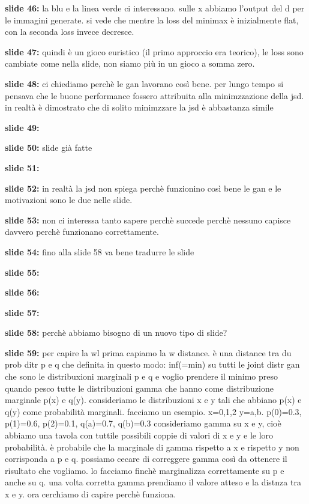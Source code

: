 \textbf{slide 46:} la blu e la linea verde ci interessano. sulle x abbiamo l'output del d per le immagini 
generate. si vede che mentre la loss del minimax è inizialmente flat, con la seconda loss invece decresce.

\textbf{slide 47:} quindi è un gioco euristico (il primo approccio era teorico), le loss sono cambiate come
nella slide, non siamo più in un gioco a somma zero.

\textbf{slide 48:} ci chiediamo perchè le gan lavorano così bene. per lungo tempo si pensava che le buone 
performance fossero attribuita alla minimzzazione della jsd. in realtà è dimostrato che di solito minimzzare 
la jsd è abbastanza simile 

\textbf{slide 49:} 

\textbf{slide 50:} slide già fatte

\textbf{slide 51:}

\textbf{slide 52:} in realtà la jsd non spiega perchè funzionino così bene le gan e le motivazioni sono le 
due nelle slide. 

\textbf{slide 53:} non ci interessa tanto sapere perchè succede perchè nessuno capisce davvero perchè 
funzionano correttamente. 

\textbf{slide 54:} fino alla slide 58 va bene tradurre le slide

\textbf{slide 55:} 

\textbf{slide 56:} 

\textbf{slide 57:}

\textbf{slide 58:} perchè abbiamo bisogno di un nuovo tipo di slide? 

\textbf{slide 59:} per capire la wl prima capiamo la w distance. è una distance tra du prob ditr p e q 
che definita in questo modo: inf(=min) su tutti le joint distr gan che sono le distribuxioni marginali p e 
q e voglio prendere il minimo preso quando pesco tutte le distribuzioni gamma che hanno come distribuzione 
marginale p(x) e q(y). consideriamo le distribuzioni x e y tali che abbiano p(x) e q(y) come probabilità 
marginali. facciamo un esempio. x={0,1,2} y={a,b}. p(0)=0.3, p(1)=0.6, p(2)=0.1, q(a)=0.7, q(b)=0.3 
consideriamo gamma su x e y, cioè abbiamo una tavola con tuttile possibili coppie di valori di x e y e 
le loro probabilità. è probabile che la marginale di gamma rispetto a x e rispetto y non corrisponda a p e q.
possiamo cecare di correggere gamma così da ottenere il risultato che vogliamo. lo facciamo finchè marginalizza
correttamente su p e anche su q. una volta corretta gamma prendiamo il valore atteso e la distnza tra x e y.
ora cerchiamo di capire perchè funziona. 

